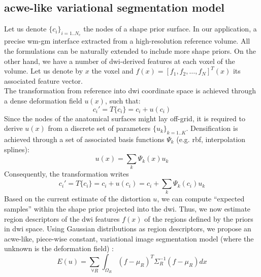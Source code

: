 \subsection{\acl{acwe}-like variational segmentation model}
%
Let us denote $\{c_i\}_{i=1..N_c}$ the nodes of a shape prior surface. In
our application, a precise \ac{wm}-\ac{gm} interface extracted from a
high-resolution reference volume. All the formulations can be naturally
extended to include more shape priors. On the other hand, we have a 
number of \ac{dwi}-derived features at each
voxel of the volume. Let us denote by $x$ the voxel and 
$f(x) = [ f_1, f_2, \ldots, f_N]^T(x)$ its associated feature vector.\\
%
The transformation from reference into \ac{dwi} coordinate space is 
achieved through a dense deformation field $u(x)$, such that:
%
\begin{equation}
c_i' = T\{c_i\} = c_i + u(c_i)
\end{equation}
% 
Since the nodes of the anatomical surfaces might lay off-grid, it is 
required to derive $u(x)$ from a discrete set of parameters $\{u_k\}_{k=1..K}$.
Densification is achieved through a set of associated basis functions 
$\Psi_k$ (e.g. rbf, interpolation splines):
%
\begin{equation}
u(x) = \sum_k \Psi_k(x) u_k
\end{equation}
%
Consequently, the transformation writes
%
\begin{equation}
\label{eq:transformation}
c_i' = T\{c_i\} = c_i + u(c_i) = c_i + \sum_k \Psi_k(c_i)u_k
\end{equation} 
%
%
Based on the current estimate of the distortion $u$, we can compute 
``expected samples'' within the shape prior projected into the \ac{dwi}.
Thus, we now estimate region descriptors of the \ac{dwi} features 
$f(x)$ of the regions defined by the priors in \ac{dwi} space.
%
Using Gaussian distributions as region descriptors, we propose an
\ac{acwe}-like, piece-wise constant, variational image segmentation
model (where the unknown is the deformation field)
\cite{chan_active_2001}:
\begin{equation}
\label{eq:gaussian_energy}
E(u)= \sum_{\forall{R}} \int_{\Omega_R} (f-\mu_R)^T\Sigma_R^{-1}(f-\mu_R) dx
\end{equation}
